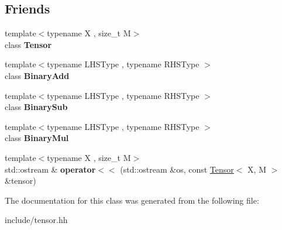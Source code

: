 \subsection*{Friends}
\begin{DoxyCompactItemize}
\item 
{\footnotesize template$<$typename X , size\+\_\+t M$>$ }\\class {\bfseries Tensor}\hypertarget{classtensor_1_1Shape_3_010_01_4_af4a07134de1525172d3c60c57e8f1496}{}\label{classtensor_1_1Shape_3_010_01_4_af4a07134de1525172d3c60c57e8f1496}

\item 
{\footnotesize template$<$typename L\+H\+S\+Type , typename R\+H\+S\+Type $>$ }\\class {\bfseries Binary\+Add}\hypertarget{classtensor_1_1Shape_3_010_01_4_a4d665549d16efb911a856dc6fd122618}{}\label{classtensor_1_1Shape_3_010_01_4_a4d665549d16efb911a856dc6fd122618}

\item 
{\footnotesize template$<$typename L\+H\+S\+Type , typename R\+H\+S\+Type $>$ }\\class {\bfseries Binary\+Sub}\hypertarget{classtensor_1_1Shape_3_010_01_4_afc63fe61d41c24c197bbf470274e78c5}{}\label{classtensor_1_1Shape_3_010_01_4_afc63fe61d41c24c197bbf470274e78c5}

\item 
{\footnotesize template$<$typename L\+H\+S\+Type , typename R\+H\+S\+Type $>$ }\\class {\bfseries Binary\+Mul}\hypertarget{classtensor_1_1Shape_3_010_01_4_a4e70ecf474c03f7e2051b75bb9af6110}{}\label{classtensor_1_1Shape_3_010_01_4_a4e70ecf474c03f7e2051b75bb9af6110}

\item 
{\footnotesize template$<$typename X , size\+\_\+t M$>$ }\\std\+::ostream \& {\bfseries operator$<$$<$} (std\+::ostream \&os, const \hyperlink{classtensor_1_1Tensor}{Tensor}$<$ X, M $>$ \&tensor)\hypertarget{classtensor_1_1Shape_3_010_01_4_a604769864add641c2cb711a392fb919b}{}\label{classtensor_1_1Shape_3_010_01_4_a604769864add641c2cb711a392fb919b}

\end{DoxyCompactItemize}


The documentation for this class was generated from the following file\+:\begin{DoxyCompactItemize}
\item 
include/tensor.\+hh\end{DoxyCompactItemize}
